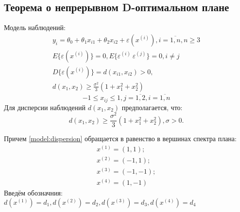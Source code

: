 \subsection{Теорема о непрерывном D-оптимальном плане}
Модель наблюдений:
\begin{gather} \label{model:start}
y_i = \theta_0 + \theta_1 x_{i1} + \theta_2 x_{i2} + \varepsilon(x^{(i)}), i = \overline{1, n}, n \ge 3 \\
E\{ \varepsilon(x^{(i)}) \} = 0, E\{ \varepsilon^{(i)}\ \varepsilon^{(j)} \} = 0, i \ne j \\
D\{ \varepsilon(x^{(i)}) \} = d(x_{i1}, x_{i2}) > 0, \\
d(x_1, x_2) \ge \frac{\sigma^2}{3}(1 + x_1^2 + x_2^2) \label{model:end}
\end{gather}
$$ -1 \le x_{ij} \le 1, j = \overline{1, 2}, i = \overline{1, n}$$
Для дисперсии наблюдений $d(x_1, x_2)$ предполагается, что:
\begin{equation}\label{model:dispersion}
d(x_1, x_2) \ge \frac{\sigma^2}{3}(1 + x_1^2 + x_2^2), \sigma > 0.
\end{equation}

Причем \eqref{model:dispersion} обращается в равенство в вершинах спектра плана:
\begin{equation}\label{plan-points}
\begin{gathered}
x^{(1)}=(1, 1); \\
x^{(2)}=(-1, 1); \\
x^{(3)}=(-1, -1); \\
x^{(4)}=(1, -1)
\end{gathered}
\end{equation}
Введём обозначния: $d(x^{(1)}) = d_1, d(x^{(2)}) = d_2, d(x^{(3)}) = d_3, d(x^{(4)}) = d_4$

